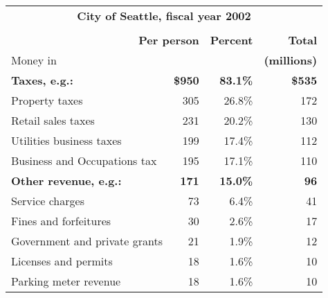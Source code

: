 


\begin{table}[p]
\begin{center}
\begin{tabular}{lrrr}
\multicolumn{4}{c}{\bf City of Seattle, fiscal year 2002} \\ %
& & & \\ %
\multicolumn{2}{r}{\bf Per person} & \bf Percent & \bf Total \\ %
\sc Money in & & & \multicolumn{1}{c}{\small \bf (millions)} \\ %
%
\hspace{.1cm} \bf\small Taxes\rm, e.g.: & \bf\small \$950 & \bf\small 83.1\% & \bf\small \$535 \\ %
\hspace{.4cm} Property taxes & 305 & 26.8\% & 172 \\
\hspace{.4cm} Retail sales taxes & 231 & 20.2\% & 130 \\
\hspace{.4cm} Utilities business taxes & 199 & 17.4\% & 112 \\
\hspace{.4cm} Business and Occupations tax & 195 & 17.1\% & 110 \\
\hspace{.1cm} \bf\small Other revenue\rm, e.g.: & \bf\small 171 & \bf\small 15.0\% & \bf\small 96 \\ %
\hspace{.4cm} Service charges & 73 & 6.4\% & 41 \\
\hspace{.4cm} Fines and forfeitures & 30 & 2.6\% & 17 \\
\hspace{.4cm} Government and private grants & 21 & 1.9\% & 12 \\
\hspace{.4cm} Licenses and permits & 18 & 1.6\% & 10 \\
\hspace{.4cm} Parking meter revenue & 18 & 1.6\% & 10 \\

\end{tabular}
\end{center}
\end{table}
